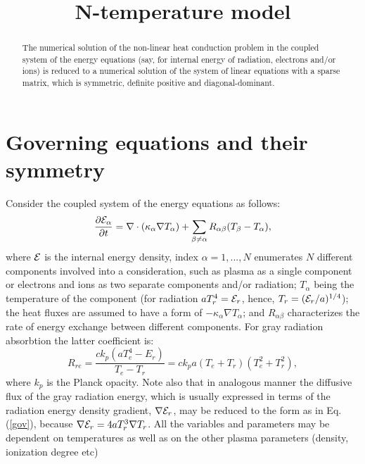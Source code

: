 \documentclass[12pt]{revtex4}
\begin{document}
\title{ N-temperature model}
\begin{abstract}
The numerical solution of the non-linear heat conduction problem in the
coupled system of the energy equations (say, for internal energy of radiation, 
electrons and/or ions) is reduced to a numerical solution of the system of linear 
equations with a sparse matrix, which is symmetric, definite positive and 
diagonal-dominant.
\end{abstract}
\maketitle 
\section{Governing equations and their symmetry}
Consider the coupled system of the energy equations as follows:
\begin{equation}\label{gov}
\frac{\partial {\cal E}_\alpha}{\partial t}=
\nabla\cdot\left(\kappa_\alpha\nabla T_\alpha\right)+
\sum_{\beta\ne\alpha}
{R_{\alpha\beta}(T_\beta-T_\alpha)},
\end{equation}
where $\cal E$ is the internal energy density, index $\alpha=1,...,N$ enumerates $N$ 
different components involved into a consideration, such as plasma as a 
single component or electrons and ions as two separate components and/or radiation; 
$T_\alpha$ being the temperature of the component (for radiation 
$aT^4_r={\cal E}_r$, hence, $T_r= ({\cal E}_r/a)^{1/4}$); the heat fluxes 
are assumed to have a form of
$-\kappa_\alpha\nabla T_\alpha$; and $R_{\alpha\beta}$ 
characterizes the rate of energy exchange between different components. For 
gray radiation absorbtion the latter coefficient is:
\begin{equation}
R_{re}=\frac{c k_p(aT_e^4-E_r)}{T_e-T_r}=c k_p a(T_e+T_r)(T_e^2+T_r^2),
\end{equation}  
where $k_p$ is the Planck opacity. Note also that in analogous manner the diffusive
flux of the gray radiation energy, which is usually expressed in terms of the radiation
energy density gradient, $\nabla{\cal E}_r$, may be reduced to the form as in 
Eq.(\ref{gov}), because $\nabla{\cal E}_r=4aT^3_r\nabla T_r$. All the variables and 
parameters
may be dependent on temperatures as well as on the other plasma parameters (density, ionization degree etc)
\end{document}
